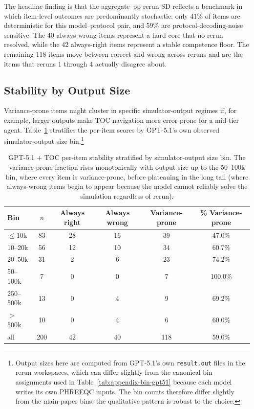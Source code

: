\documentclass{article}
\begin{document}
The headline finding is that the aggregate \GPTFiveOneTOCRerunSD\,pp rerun SD reflects a benchmark in which item-level outcomes are predominantly stochastic: only 41\% of items are deterministic for this model--protocol pair, and 59\% are protocol-decoding-noise sensitive. The 40 always-wrong items represent a hard core that no rerun resolved, while the 42 always-right items represent a stable competence floor. The remaining 118 items move between correct and wrong across reruns and are the items that reruns 1 through 4 actually disagree about.

\subsection{Stability by Output Size}

Variance-prone items might cluster in specific simulator-output regimes if, for example, larger outputs make TOC navigation more error-prone for a mid-tier agent. Table~\ref{tab:appendix-stability-by-bin} stratifies the per-item scores by GPT-5.1's own observed simulator-output size bin.\footnote{Output sizes here are computed from GPT-5.1's own \texttt{result.out} files in the rerun workspaces, which can differ slightly from the canonical bin assignments used in Table~\ref{tab:appendix-bin-gpt51} because each model writes its own PHREEQC inputs. The bin counts therefore differ slightly from the main-paper bins; the qualitative pattern is robust to the choice.}

\begin{table}[h]
\centering
\small
\setlength{\tabcolsep}{6pt}
\caption{GPT-5.1 + TOC per-item stability stratified by simulator-output size bin. The variance-prone fraction rises monotonically with output size up to the 50--100k bin, where every item is variance-prone, before plateauing in the long tail (where always-wrong items begin to appear because the model cannot reliably solve the simulation regardless of rerun).}
\label{tab:appendix-stability-by-bin}
\begin{tabular}{lccccc}
\toprule
Bin & $n$ & Always right & Always wrong & Variance-prone & \% Variance-prone \\
\midrule
$\le$10k & 83 & 28 & 16 & 39 & 47.0\% \\
10--20k & 56 & 12 & 10 & 34 & 60.7\% \\
20--50k & 31 & 2 & 6 & 23 & 74.2\% \\
50--100k & 7 & 0 & 0 & 7 & 100.0\% \\
250--500k & 13 & 0 & 4 & 9 & 69.2\% \\
$>$500k & 10 & 0 & 4 & 6 & 60.0\% \\
\midrule
all & 200 & 42 & 40 & 118 & 59.0\% \\
\bottomrule
\end{tabular}
\end{table}
\end{document}
